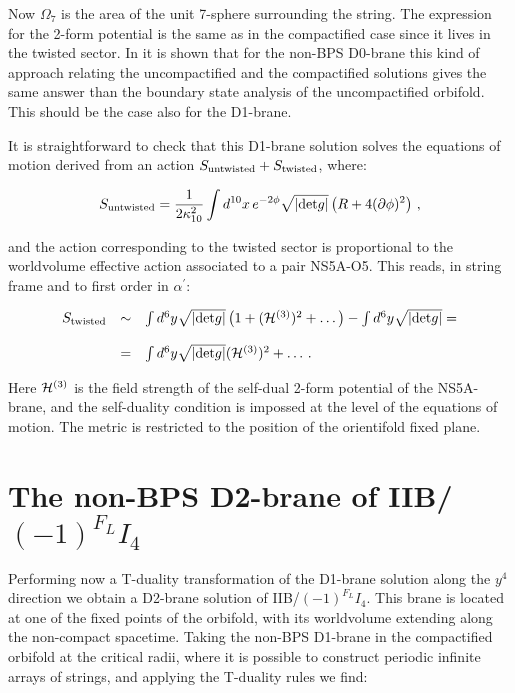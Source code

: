 \documentclass[12pt,a4paper]{article}
\begin{document}
\noindent Now $\Omega_7$ is the
area of the unit 7-sphere surrounding the string.
The expression for the 2-form potential is the same as in the compactified
case since it lives in the twisted sector.
In \cite{EP} it is shown that for the non-BPS D0-brane this kind of 
approach relating the uncompactified and the compactified solutions
gives the same answer than the boundary state analysis  
of the uncompactified orbifold. This should be the case also for the
D1-brane. 

It is straightforward to check that this D1-brane solution 
solves the equations of motion derived from
an action $S_{{\rm untwisted}}+S_{{\rm twisted}}$, where:

\begin{equation}
S_{{\rm untwisted}}=\frac{1}{2\kappa^2_{10}}\int d^{10}x\,
e^{-2\phi}\sqrt{|{\rm det}g|}\left( R+4 (\partial\phi)^2\right)\, ,
\end{equation}

\noindent and the action corresponding to the twisted sector is 
proportional to the worldvolume effective action associated to 
a pair NS5A-O5. This
reads, in string frame and to first order in $\alpha^\prime$:

\begin{equation}
\begin{array}{rcl}
S_{{\rm twisted}}&\sim & \int d^6 y \sqrt{|{\rm det}g|}
\left(1+({\cal H}^{(3)})^2+\dots\right) - 
\int d^6 y \sqrt{|{\rm det}g|}= \\
&&\\
&=&\int d^6 y \sqrt{|{\rm det}g|} ({\cal H}^{(3)})^2+\dots \, .
\end{array}
\end{equation}

\noindent Here ${\cal H}^{(3)}$ is the field strength of the
self-dual 2-form potential of the NS5A-brane, and the self-duality 
condition is impossed at the level of the 
equations of motion. The
metric is restricted to the position of the orientifold fixed plane. 



\section{The non-BPS D2-brane of IIB/$(-1)^{F_L}I_4$}

Performing now a T-duality transformation of the D1-brane solution
along the $y^4$ direction
we obtain a D2-brane solution of IIB/$(-1)^{F_L}I_4$. 
This brane is located at one of the fixed points of the orbifold,
with its worldvolume extending along the non-compact spacetime.
Taking
the non-BPS D1-brane in the compactified orbifold at the
critical radii, where it is possible to
construct periodic infinite arrays of strings,
and applying the T-duality rules we find:
\end{document}
